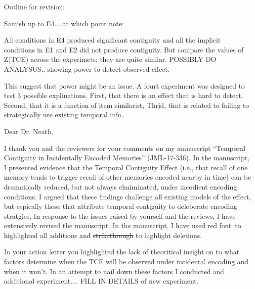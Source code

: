 \documentclass[12pt]{article}
\begin{document}



Outline for revision:

Samish up to E4... at which point note:

All conditions in E4 produced significant contiguity and all the implicit conditions in E1 and E2 did not produce contiguity. But compare the values of Z(TCE) across the experimets: they are quite similar. POSSIBLY DO ANALYSUS.. showing power to detect observed effect.

This suggest that power might be an issue. A fourt experiment was designed to test 3 possible explinations. First, that there is an effect that is hard to detect. Second, that it is a function of item similarirt, Thrid, that is related to failing to strategically use existing temporal info.




Dear Dr. Neath,
 

I thank you and the reviewers for your comments on my manuscript  ``Temporal Contiguity in Incidentally Encoded Memories'' (JML-17-336). In the manuscript, I presented evidence that the Temporal Contiguity Effect (i.e., that recall of one memory tends to trigger recall of other memories encoded nearby in time) can be dramatically reduced, but not always elmiminated, under incodient encoding conditions. I argued that these findings challenge all existing models of the effect, but espically those that attribute temporal contiguity to deleberate encoding stratgies. In response to the issues raised by yourself and the reviews, I have extensively revised the manuscript. In the manuscript, I have used  \color{red}red font\color{black}~to highlighted all additions and \st{strikethrough} to highlight deletions.


In your action letter you highlighted the lack of theoritical insight on to what factors determine when the TCE will be observed under incidental encoding and when it won't. In an attempt to nail down these factors I conducted and additional experiment.... FILL IN DETAILS of new experiment.
\end{document}
